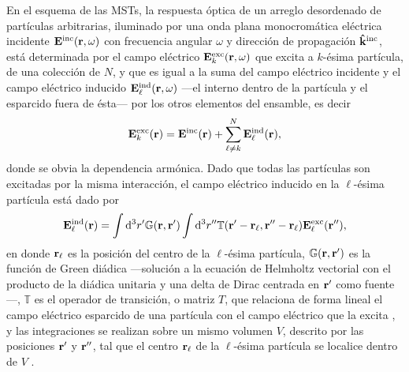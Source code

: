 En el esquema de las MSTs, la respuesta óptica de un arreglo desordenado de partículas arbitrarias, iluminado por una onda plana monocromática eléctrica incidente $\vb{E}^\text{inc}(\vb{r},\omega)$ con frecuencia angular $\omega$ y dirección de propagación $\vu{k}^\text{inc}$, está determinada por el campo eléctrico $\vb{E}^\text{exc}_k(\vb{r},\omega)$ que excita a $k$-ésima partícula, de una colección de $N$, y que es igual a la suma del campo eléctrico incidente y el campo eléctrico inducido $\vb{E}^\text{ind}_\ell(\vb{r},\omega)$ ---el interno dentro de la partícula y el esparcido fuera de ésta--- por los otros elementos del ensamble, es decir \cite{garcia2012multiple,barrera_coherent_2003}
%
\begin{align}
	\vb{E}^\text{exc}_k(\vb{r}) = \vb{E}^\text{inc}(\vb{r}) + \sum_{\ell\neq k}^N \vb{E}^\text{ind}_\ell(\vb{r}),
	\label{eq:Eexc}
\end{align}
%
donde se obvia la dependencia armónica. Dado que todas las partículas son excitadas por la misma interacción,  el campo eléctrico inducido en la $\ell$-ésima partícula está dado por \cite{garcia2012multiple,barrera_coherent_2003}
%
\begin{align}
	\vb{E}^\text{ind}_\ell(\vb{r}) =
	\int\dd^3 r' \mathbb{G}(\vb{r},\vb{r}')
	\int\dd^3 r''\mathbb{T}(\vb{r}'-\vb{r}_\ell,\vb{r}''-\vb{r}_\ell) \vb{E}_\ell^\text{exc}(\vb{r}''),
	\label{eq:Eind}
\end{align}
%
en donde $\vb{r}_\ell$ es la posición del centro de la $\ell$-ésima partícula, $\mathbb{G}(\vb{r},\vb{r}')$ es la función de Green diádica ---solución a la ecuación de Helmholtz vectorial con el producto de la diádica unitaria y una delta de Dirac centrada en $\vb{r}'$ como fuente \cite{tsang_scattering_2000}---, $\mathbb{T}$ es el operador de transición, o matriz $T$, que relaciona de forma lineal el campo eléctrico esparcido de una partícula con el campo eléctrico que la excita \cite{tsang_scattering_2000}, y las integraciones se realizan sobre un mismo volumen $V$, descrito por las posiciones $\vb{r}'$ y $\vb{r}''$, tal que el centro $\vb{r}_\ell$ de la $\ell$-ésima partícula se localice dentro de $V$ \cite{barrera_coherent_2003}.

